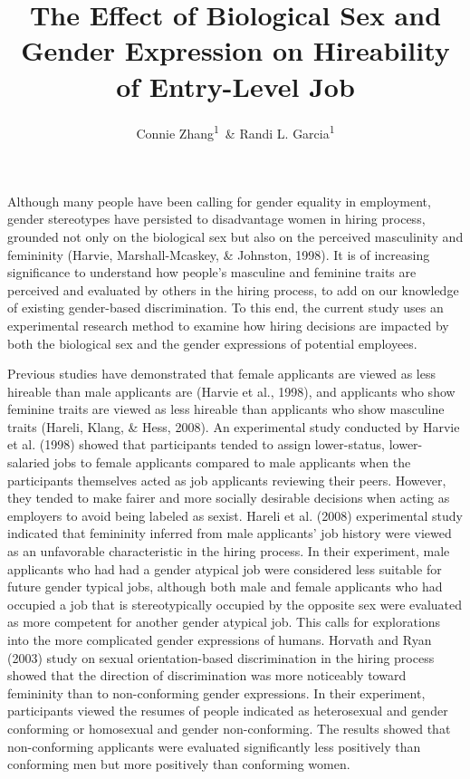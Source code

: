 \documentclass[english,man]{apa6}
\title{The Effect of Biological Sex and Gender Expression on Hireability of
Entry-Level Job}
\author{Connie Zhang\textsuperscript{1}~\& Randi L. Garcia\textsuperscript{1}}
\affiliation{
    \vspace{0.5cm}
          \textsuperscript{1} Smith College  }
\theoremstyle{definition}
\theoremstyle{definition}
\theoremstyle{remark}
\begin{document}
\maketitle

\setcounter{secnumdepth}{0}



Although many people have been calling for gender equality in
employment, gender stereotypes have persisted to disadvantage women in
hiring process, grounded not only on the biological sex but also on the
perceived masculinity and femininity (Harvie, Marshall-Mcaskey, \&
Johnston, 1998). It is of increasing significance to understand how
people's masculine and feminine traits are perceived and evaluated by
others in the hiring process, to add on our knowledge of existing
gender-based discrimination. To this end, the current study uses an
experimental research method to examine how hiring decisions are
impacted by both the biological sex and the gender expressions of
potential employees.

Previous studies have demonstrated that female applicants are viewed as
less hireable than male applicants are (Harvie et al., 1998), and
applicants who show feminine traits are viewed as less hireable than
applicants who show masculine traits (Hareli, Klang, \& Hess, 2008). An
experimental study conducted by Harvie et al. (1998) showed that
participants tended to assign lower-status, lower-salaried jobs to
female applicants compared to male applicants when the participants
themselves acted as job applicants reviewing their peers. However, they
tended to make fairer and more socially desirable decisions when acting
as employers to avoid being labeled as sexist. Hareli et al. (2008)
experimental study indicated that femininity inferred from male
applicants' job history were viewed as an unfavorable characteristic in
the hiring process. In their experiment, male applicants who had had a
gender atypical job were considered less suitable for future gender
typical jobs, although both male and female applicants who had occupied
a job that is stereotypically occupied by the opposite sex were
evaluated as more competent for another gender atypical job. This calls
for explorations into the more complicated gender expressions of humans.
Horvath and Ryan (2003) study on sexual orientation-based discrimination
in the hiring process showed that the direction of discrimination was
more noticeably toward femininity than to non-conforming gender
expressions. In their experiment, participants viewed the resumes of
people indicated as heterosexual and gender conforming or homosexual and
gender non-conforming. The results showed that non-conforming applicants
were evaluated significantly less positively than conforming men but
more positively than conforming women.
\end{document}
